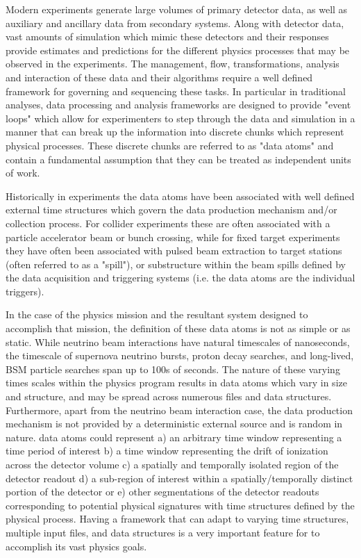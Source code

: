 \documentclass[../main-v1.tex]{subfiles}
\begin{document}
Modern  experiments generate large volumes of primary detector data, as well as auxiliary and ancillary data from secondary systems. Along with detector data, vast amounts of simulation which mimic these detectors and their responses provide estimates and predictions for the different physics processes that may be observed in the experiments.  The management, flow, transformations, analysis and interaction of these data and their algorithms require a well defined framework for governing and sequencing these tasks.  In particular in traditional  analyses, data processing and analysis frameworks are designed to provide "event loops" which allow for experimenters to step through the data and simulation in a manner that can break up the information into discrete chunks which represent physical processes.  These discrete chunks are referred to as "data atoms" and contain a fundamental assumption that they can be treated as independent units of work.

Historically in  experiments the data atoms have been associated with well defined external time structures which govern the data production mechanism and/or collection process.  For collider experiments these are often associated with a particle accelerator beam or bunch crossing, while for fixed target experiments they have often been associated with pulsed beam extraction to target stations (often referred to as a "spill"), or substructure within the beam spills defined by the data acquisition and triggering systems (i.e. the data atoms are the individual triggers).  

In the case of the  physics mission and the resultant system designed to accomplish that mission, the definition of these data atoms is not as simple or as static. %
While neutrino beam interactions have natural timescales of nanoseconds, the timescale of supernova neutrino bursts, proton decay searches, and long-lived, BSM particle searches span up to 100s of seconds. The nature of these varying times scales within the  physics program results in data atoms which vary in size and structure, and may be spread across numerous files and data structures. 
Furthermore, apart from the neutrino beam interaction case, the data production mechanism is not provided by a deterministic external source and is random in nature.
 data atoms could represent a) an arbitrary time window representing a time period of interest b) a time window representing the drift of ionization across the detector volume c) a spatially and temporally isolated region of the detector readout d) a sub-region of interest within a spatially/temporally distinct portion of the detector or e) other segmentations of the  detector readouts corresponding to potential physical signatures with time structures defined by the physical process. Having a framework that can adapt to varying time structures, multiple input files, and data structures is a very important feature for  to accomplish its vast physics goals.
\end{document}
